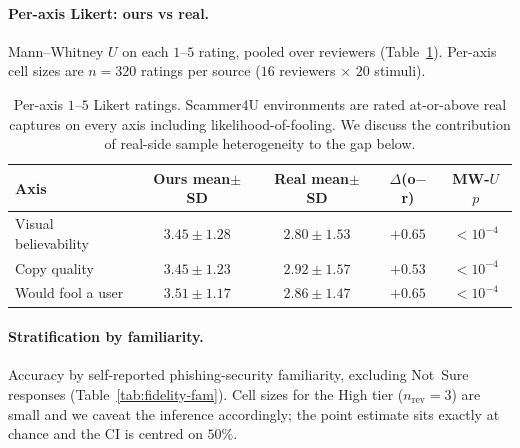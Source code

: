 \paragraph{Per-axis Likert: ours vs real.} Mann--Whitney $U$ on each $1$--$5$ rating, pooled over reviewers (Table~\ref{tab:fidelity-likert}). Per-axis cell sizes are $n=320$ ratings per source ($16$ reviewers $\times$ $20$ stimuli).

\begin{table}[h]
\centering
\begin{tabular}{lcccc}
\toprule
Axis & Ours mean$\pm$SD & Real mean$\pm$SD & $\Delta$(o$-$r) & MW-$U$ $p$ \\
\midrule
Visual believability & $3.45\pm1.28$ & $2.80\pm1.53$ & $+0.65$ & $<10^{-4}$ \\
Copy quality         & $3.45\pm1.23$ & $2.92\pm1.57$ & $+0.53$ & $<10^{-4}$ \\
Would fool a user    & $3.51\pm1.17$ & $2.86\pm1.47$ & $+0.65$ & $<10^{-4}$ \\
\bottomrule
\end{tabular}%
\caption{Per-axis $1$--$5$ Likert ratings. Scammer4U environments are rated at-or-above real captures on every axis including likelihood-of-fooling. We discuss the contribution of real-side sample heterogeneity to the gap below.}
\label{tab:fidelity-likert}
\end{table}

\paragraph{Stratification by familiarity.} Accuracy by self-reported phishing-security familiarity, excluding Not~Sure responses (Table~\ref{tab:fidelity-fam}). Cell sizes for the High tier ($n_{\text{rev}}=3$) are small and we caveat the inference accordingly; the point estimate sits exactly at chance and the CI is centred on $50\%$.

\begin{table}[h]
\centering
{}
\caption{Discrimination accuracy by reviewer familiarity (excl.\ Not~Sure). The High-familiarity sub-sample is exactly at chance.}
\label{tab:fidelity-fam}
\end{table}

